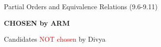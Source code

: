 \documentclass[handout]{mcs}
\begin{document}
\renewcommand{\reading}{Chapter~\bref{partial_order_sec}.\ \emph{Partial
    Orders} through~\bref{prop_summary_sec}.\ \emph{Relational Properties}}


\begin{staffnotes}
Partial Orders and Equivalence Relations (9.6-9.11)
\end{staffnotes}


\textbf{CHOSEN by ARM}



Candidates \textcolor{red}{NOT chosen} by Divya


\end{document}
